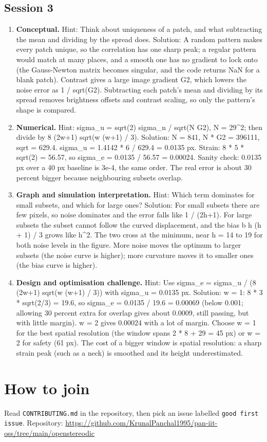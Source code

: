 \documentclass[11pt,a4paper]{article}
\begin{document}
\subsection*{Session 3}
\begin{enumerate}[nosep]
\item \textbf{Conceptual.} Hint: Think about uniqueness of a patch, and what subtracting the mean and dividing by the spread does. Solution: A random pattern makes every patch unique, so the correlation has one sharp peak; a regular pattern would match at many places, and a smooth one has no gradient to lock onto (the Gauss-Newton matrix becomes singular, and the code returns NaN for a blank patch). Contrast gives a large image gradient G2, which lowers the noise error as 1 / sqrt(G2). Subtracting each patch's mean and dividing by its spread removes brightness offsets and contrast scaling, so only the pattern's shape is compared.
\item \textbf{Numerical.} Hint: sigma\_u = sqrt(2) sigma\_n / sqrt(N G2), N = 29\textasciicircum{}2; then divide by 8 (2w+1) sqrt(w (w+1) / 3). Solution: N = 841, N * G2 = 396111, sqrt = 629.4. sigma\_u = 1.4142 * 6 / 629.4 = 0.0135 px. Strain: 8 * 5 * sqrt(2) = 56.57, so sigma\_e = 0.0135 / 56.57 = 0.00024. Sanity check: 0.0135 px over a 40 px baseline is 3e-4, the same order. The real error is about 30 percent bigger because neighbouring subsets overlap.
\item \textbf{Graph and simulation interpretation.} Hint: Which term dominates for small subsets, and which for large ones? Solution: For small subsets there are few pixels, so noise dominates and the error falls like 1 / (2h+1). For large subsets the subset cannot follow the curved displacement, and the bias b h (h + 1) / 3 grows like h\textasciicircum{}2. The two cross at the minimum, near h = 14 to 19 for both noise levels in the figure. More noise moves the optimum to larger subsets (the noise curve is higher); more curvature moves it to smaller ones (the bias curve is higher).
\item \textbf{Design and optimisation challenge.} Hint: Use sigma\_e = sigma\_u / (8 (2w+1) sqrt(w (w+1) / 3)) with sigma\_u = 0.0135 px. Solution: w = 1: 8 * 3 * sqrt(2/3) = 19.6, so sigma\_e = 0.0135 / 19.6 = 0.00069 (below 0.001; allowing 30 percent extra for overlap gives about 0.0009, still passing, but with little margin). w = 2 gives 0.00024 with a lot of margin. Choose w = 1 for the best spatial resolution (the window spans 2 * 8 + 29 = 45 px) or w = 2 for safety (61 px). The cost of a bigger window is spatial resolution: a sharp strain peak (such as a neck) is smoothed and its height underestimated.
\end{enumerate}

\section{How to join}
Read \texttt{CONTRIBUTING.md} in the repository, then pick an issue labelled \texttt{good first issue}. Repository: \url{https://github.com/KrunalPanchal1995/pan-iit-oss/tree/main/openstereodic}
\end{document}
